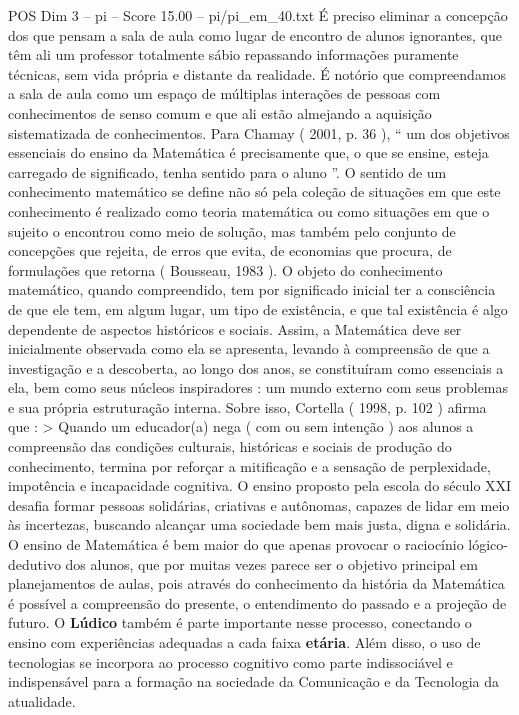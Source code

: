 \begin{textsample}{POS Dim 3 – pi – Score 15.00 – pi/pi\_em\_40.txt}
É preciso eliminar a concepção dos que pensam a sala de aula como lugar de encontro de alunos ignorantes, que têm ali um professor totalmente sábio repassando informações puramente técnicas, sem vida própria e distante da realidade.
É notório que compreendamos a sala de aula como um espaço de múltiplas interações de pessoas com conhecimentos de senso comum e que ali estão almejando a aquisição sistematizada de conhecimentos.
Para Chamay ( 2001, p. 36 ), “ um dos objetivos essenciais do ensino da Matemática é precisamente que, o que se ensine, esteja carregado de significado, tenha sentido para o aluno ”.
O sentido de um conhecimento matemático se define não só pela coleção de situações em que este conhecimento é realizado como teoria matemática ou como situações em que o sujeito o encontrou como meio de solução, mas também pelo conjunto de concepções que rejeita, de erros que evita, de economias que procura, de formulações que retorna ( Bousseau, 1983 ).
O objeto do conhecimento matemático, quando compreendido, tem por significado inicial ter a consciência de que ele tem, em algum lugar, um tipo de existência, e que tal existência é algo dependente de aspectos históricos e sociais.
Assim, a Matemática deve ser inicialmente observada como ela se apresenta, levando à compreensão de que a investigação e a descoberta, ao longo dos anos, se constituíram como essenciais a ela, bem como seus núcleos inspiradores : um mundo externo com seus problemas e sua própria estruturação interna.
Sobre isso, Cortella ( 1998, p. 102 ) afirma que : > Quando um educador(a) nega ( com ou sem intenção ) aos alunos a compreensão das condições culturais, históricas e sociais de produção do conhecimento, termina por reforçar a mitificação e a sensação de perplexidade, impotência e incapacidade cognitiva.
O ensino proposto pela escola do século XXI desafia formar pessoas solidárias, criativas e autônomas, capazes de lidar em meio às incertezas, buscando alcançar uma sociedade bem mais justa, digna e solidária.
O ensino de Matemática é bem maior do que apenas provocar o raciocínio lógico-dedutivo dos alunos, que por muitas vezes parece ser o objetivo principal em planejamentos de aulas, pois através do conhecimento da história da Matemática é possível a compreensão do presente, o entendimento do passado e a projeção de futuro.
O \textbf{Lúdico} também é parte importante nesse processo, conectando o ensino com experiências adequadas a cada faixa \textbf{etária}.
Além disso, o uso de tecnologias se incorpora ao processo cognitivo como parte indissociável e indispensável para a formação na sociedade da Comunicação e da Tecnologia da atualidade.

\end{textsample}
